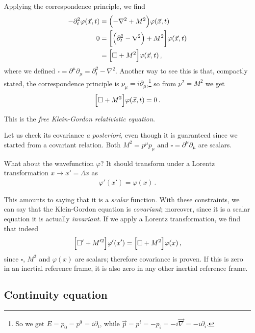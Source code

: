 \documentclass[main.tex]{subfiles}
\begin{document}
Applying the correspondence principle, we find 
%
\begin{align}
- \partial_{t}^2 \varphi (\vec{x}, t) &= \qty(- \nabla^2 + M^2) \varphi (\vec{x}, t)  \\
0 &= \qty[\qty(\partial_{t}^2 - \nabla^2) + M^2] \varphi (\vec{x}, t)   \\
&= \qty[\square + M^2] \varphi (\vec{x}, t)
\,,
\end{align}
%
where we defined \(\square = \partial^{\mu } \partial_{\mu } = \partial_{t}^2 - \nabla^2\). 
Another way to see this is that, compactly stated, the correspondence principle is \(p_{\mu } = i  \partial_{\mu }\),\footnote{So we get \(E = p_0 = p^{0} = i \partial_{t}\), while \(\vec{p} = p^{i} = - p_{i} = - i \vec{\nabla} = - i \partial_{i}\).} so from \(p^2= M^2\) we get 
%
\begin{align}
\qty[\square + M^2] \varphi (\vec{x}, t) = 0
\,.
\end{align}

This is the \emph{free Klein-Gordon relativistic equation}. 

Let us check its covariance \emph{a posteriori}, even though it is guaranteed since we started from a covariant relation. 
Both \(M^2 = p^{\mu } p_{\mu }\) and \(\square = \partial^{\mu } \partial_{\mu }\) are scalars.

What about the wavefunction \(\varphi \)?
It should transform under a Lorentz transformation \(x \rightarrow x' = \Lambda x\) as 
%
\begin{align}
\varphi' (x')= \varphi (x)
\,.
\end{align}

This amounts to saying that it is a \emph{scalar} function. 
With these constraints, we can say that the Klein-Gordon equation is \emph{covariant}; moreover, since it is a scalar equation it is actually \emph{invariant}. 
If we apply a Lorentz transformation, we find that indeed 
%
\begin{align}
\qty[\square' + M^{\prime 2} ] \varphi^{\prime } (x^{\prime }) = \qty[\square + M^2] \varphi (x)
\,,
\end{align}
%
since \(\square\), \(M^2\) and \(\varphi (x)\) are scalars; therefore covariance is proven. 
If this is zero in an inertial reference frame, it is also zero in any other inertial reference frame. 

\subsection{Continuity equation}
\end{document}
